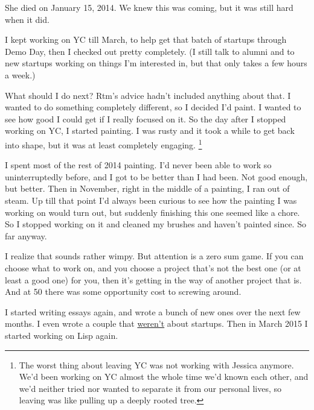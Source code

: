 She died on January 15, 2014. We knew this was coming, but it was still
hard when it did.

I kept working on YC till March, to help get that batch of startups
through Demo Day, then I checked out pretty completely. (I still talk to
alumni and to new startups working on things I'm interested in, but that
only takes a few hours a week.)

What should I do next? Rtm's advice hadn't included anything about that.
I wanted to do something completely different, so I decided I'd paint. I
wanted to see how good I could get if I really focused on it. So the day
after I stopped working on YC, I started painting. I was rusty and it
took a while to get back into shape, but it was at least completely
engaging. \footnote{The worst thing about leaving YC was not working with Jessica
anymore. We'd been working on YC almost the whole time we'd known each
other, and we'd neither tried nor wanted to separate it from our
personal lives, so leaving was like pulling up a deeply rooted tree.}

I spent most of the rest of 2014 painting. I'd never been able to work
so uninterruptedly before, and I got to be better than I had been. Not
good enough, but better. Then in November, right in the middle of a
painting, I ran out of steam. Up till that point I'd always been curious
to see how the painting I was working on would turn out, but suddenly
finishing this one seemed like a chore. So I stopped working on it and
cleaned my brushes and haven't painted since. So far anyway.

I realize that sounds rather wimpy. But attention is a zero sum game. If
you can choose what to work on, and you choose a project that's not the
best one (or at least a good one) for you, then it's getting in the way
of another project that is. And at 50 there was some opportunity cost to
screwing around.

I started writing essays again, and wrote a bunch of new ones over the
next few months. I even wrote a couple that \href{know.html}{weren't}
about startups. Then in March 2015 I started working on Lisp again.

